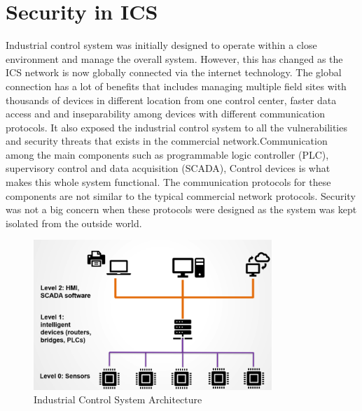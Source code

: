 \documentclass[conference]{IEEEtran}
\begin{document}
\section{Security in ICS}
Industrial control system was initially designed to operate within a close environment and manage the overall system. However, this has changed as the ICS network is now globally connected via the internet technology. The global connection has a lot of benefits that includes managing multiple field sites with thousands of devices in different location from one control center, faster data access and and inseparability among devices with different communication protocols. It also exposed the industrial control system to all the vulnerabilities and security threats that exists in the commercial network.Communication among the main components such as programmable logic controller (PLC), supervisory control and data acquisition (SCADA), Control devices is what makes this whole system functional. The communication protocols for these components are not similar to the typical commercial network protocols. Security was not a big concern when these protocols were designed as the system was kept isolated from the outside world. 
\begin{figure}[htbp]
\centering
\centerline{\includegraphics [width=9cm] {Architecture1.png}}
\caption{Industrial Control System Architecture}
\label{fig}
\end{figure}
\end{document}
